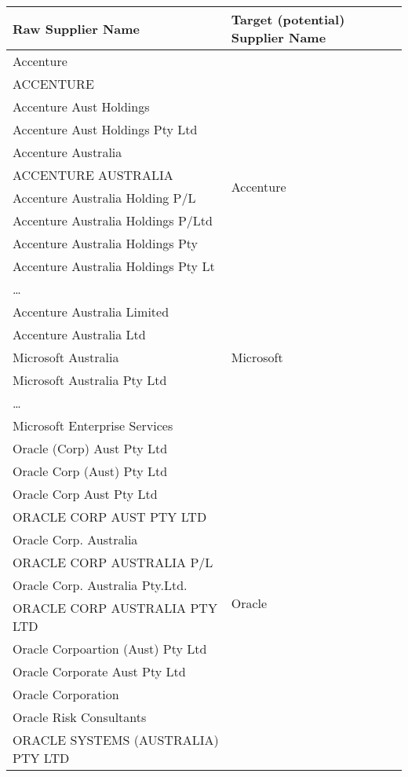 \documentclass{llncs}
\begin{document}
\begin{table}[!htb]
\renewcommand{\arraystretch}{1.3}
\begin{center}
\begin{tabular}{|l|l|}
\hline
  \textbf{Raw Supplier Name} & \textbf{Target (potential) Supplier Name}\\  \hline
  Accenture & \multirow{12}{*}{Accenture} \\
  ACCENTURE & \\ 
  Accenture Aust Holdings & \\  
  Accenture Aust Holdings Pty Ltd & \\
  Accenture Australia & \\
  ACCENTURE AUSTRALIA & \\
  Accenture  Australia Holding P/L & \\
  Accenture Australia Holdings P/Ltd & \\
  Accenture Australia Holdings Pty & \\
  Accenture Australia Holdings Pty Lt  & \\
  \ldots  & \\
  Accenture Australia Limited & \\ \hline
  Accenture Australia Ltd & \multirow{3}{*}{Microsoft} \\
  Microsoft Australia & \\ 
  Microsoft Australia Pty Ltd & \\
  \ldots  & \\
  Microsoft Enterprise Services & \\ \hline
  Oracle (Corp) Aust Pty Ltd  & \multirow{14}{*}{Oracle} \\
  Oracle Corp (Aust) Pty Ltd  & \\
  Oracle Corp Aust Pty Ltd & \\
  ORACLE CORP AUST PTY LTD & \\
  Oracle Corp. Australia & \\
  ORACLE CORP AUSTRALIA P/L & \\
  Oracle Corp. Australia Pty.Ltd. & \\
  ORACLE CORP AUSTRALIA PTY LTD & \\
  Oracle Corpoartion (Aust) Pty Ltd & \\
  Oracle Corporate Aust Pty Ltd & \\
  Oracle Corporation & \\
  Oracle Risk Consultants & \\
  ORACLE SYSTEMS (AUSTRALIA) PTY LTD & \\

\end{tabular}
\end{center}
\end{table}
\end{document}
